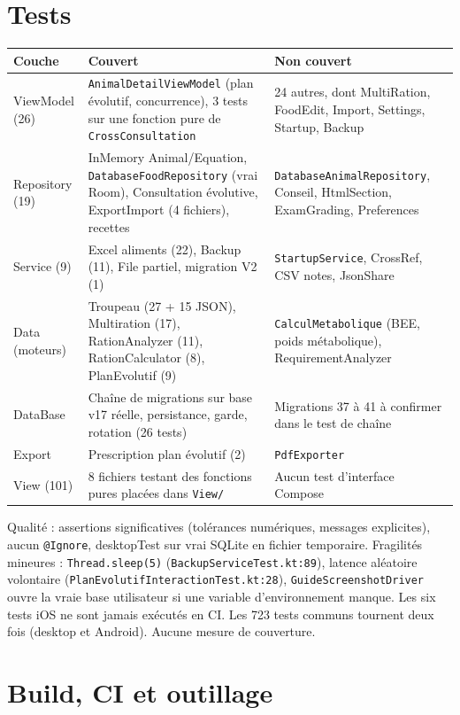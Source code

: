 \documentclass[11pt,a4paper]{article}
\newcommand{\fichier}[1]{\texttt{\small #1}}
\newcommand{\code}[1]{\texttt{#1}}
\begin{document}
\section{Tests}

\begin{center}
\begin{tabularx}{\textwidth}{lYY}
\toprule
Couche & Couvert & Non couvert \\
\midrule
ViewModel (26) & \code{AnimalDetailViewModel} (plan évolutif, concurrence), 3 tests sur une fonction pure de \code{CrossConsultation} & 24 autres, dont MultiRation, FoodEdit, Import, Settings, Startup, Backup \\
Repository (19) & InMemory Animal/Equation, \code{DatabaseFoodRepository} (vrai Room), Consultation évolutive, ExportImport (4 fichiers), recettes & \code{DatabaseAnimalRepository}, Conseil, HtmlSection, ExamGrading, Preferences \\
Service (9) & Excel aliments (22), Backup (11), File partiel, migration V2 (1) & \code{StartupService}, CrossRef, CSV notes, JsonShare \\
Data (moteurs) & Troupeau (27 + 15 JSON), Multiration (17), RationAnalyzer (11), RationCalculator (8), PlanEvolutif (9) & \code{CalculMetabolique} (BEE, poids métabolique), RequirementAnalyzer \\
DataBase & Chaîne de migrations sur base v17 réelle, persistance, garde, rotation (26 tests) & Migrations 37 à 41 à confirmer dans le test de chaîne \\
Export & Prescription plan évolutif (2) & \code{PdfExporter} \\
View (101) & 8 fichiers testant des fonctions pures placées dans \fichier{View/} & Aucun test d'interface Compose \\
\bottomrule
\end{tabularx}
\end{center}

Qualité : assertions significatives (tolérances numériques, messages explicites), aucun
\code{@Ignore}, desktopTest sur vrai SQLite en fichier temporaire. Fragilités mineures :
\code{Thread.sleep(5)} (\fichier{BackupServiceTest.kt:89}), latence aléatoire volontaire
(\fichier{PlanEvolutifInteractionTest.kt:28}), \code{GuideScreenshotDriver} ouvre la vraie base
utilisateur si une variable d'environnement manque. Les six tests iOS ne sont jamais exécutés en
CI. Les 723 tests communs tournent deux fois (desktop et Android). Aucune mesure de couverture.

\section{Build, CI et outillage}
\end{document}
